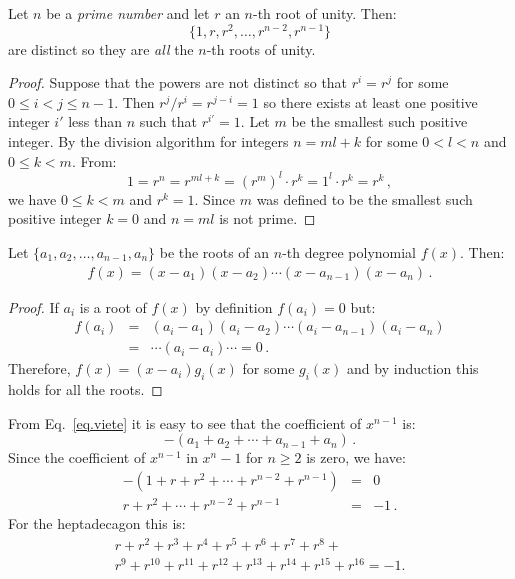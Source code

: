 \newpage

\begin{theorem}
Let $n$ be a \emph{prime number} and let $r$ an $n$-th root of unity. Then:
\[
\{1,r,r^2,\ldots,r^{n-2},r^{n-1}\}
\]
are distinct so they are \emph{all} the $n$-th roots of unity.
\end{theorem}

\begin{proof}
Suppose that the powers are not distinct so that  $r^i=r^j$ for some $0\leq i<j\leq n-1$. Then $r^j/r^i=r^{j-i}=1$ so there exists at least one positive integer $i'$ less than $n$ such that $r^{i'}=1$. Let $m$ be the smallest such positive integer. By the division algorithm for integers $n=ml+k$ for some $0<l<n$ and $0\leq k<m$. From:
\[
1=r^n=r^{ml+k}=(r^m)^l\cdot r^k=1^l\cdot r^k=r^k\,,
\]
we have $0\leq k<m$ and $r^k=1$. Since $m$  was defined to be the smallest such positive integer $k=0$ and $n=ml$ is not prime.
\end{proof}

\begin{theorem} Let $\{a_1,a_2,\ldots,a_{n-1},a_n\}$ be the roots of an $n$-th degree polynomial $f(x)$. Then:
\begin{align}\label{eq.viete}
f(x) =(x-a_1) (x-a_2)\cdots (x-a_{n-1})(x-a_n)\,.
\end{align}
\end{theorem}

\begin{proof}
If $a_i$ is a root of $f(x)$ by definition $f(a_i)=0$ but:
\begin{eqnarray*}
f(a_i)&=&(a_i-a_1) (a_i-a_2)\cdots (a_i-a_{n-1})(a_i-a_n)\\
&=&\cdots (a_i-a_i) \cdots =0\,.
\end{eqnarray*}
Therefore, $f(x)=(x-a_i)g_i(x)$ for some $g_i(x)$ and by induction this holds for all the roots.
\end{proof}

From Eq.~\ref{eq.viete} it is easy to see that the coefficient of $x^{n-1}$ is:
\[
-(a_1+a_2+\cdots+a_{n-1}+a_n)\,.
\]
Since the coefficient of $x^{n-1}$ in $x^n-1$ for $n\geq 2$ is zero, we have:
\begin{eqnarray*}
-(1+r+r^2+\cdots + r^{n-2}+r^{n-1})&=&0\\
r+r^2+\cdots + r^{n-2}+r^{n-1}&=&-1\,.
\end{eqnarray*}
For the heptadecagon this is:
\begin{multline}
r+r^2+r^3+r^4+r^5+r^6+r^7+r^8+\\
r^9+r^{10}+r^{11}+r^{12}+r^{13}+r^{14} + r^{15}+r^{16}=-1.\label{eq.minus-one}
\end{multline}

